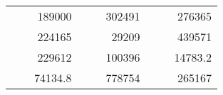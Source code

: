 \begin{table}[H]
\begin{tabular}{|ccrccrccr}
\rowcolor[HTML]{DAE8FC} 
\multicolumn{1}{|c|}{\cellcolor[HTML]{FFFFC7}}                                & \multicolumn{1}{c|}{\cellcolor[HTML]{DAE8FC}}                      & \multicolumn{1}{r|}{\cellcolor[HTML]{DAE8FC}189000}    & \multicolumn{1}{c|}{\cellcolor[HTML]{FFFFC7}}                                & \multicolumn{1}{c|}{\cellcolor[HTML]{DAE8FC}}                       & \multicolumn{1}{r|}{\cellcolor[HTML]{DAE8FC}302491}    & \multicolumn{1}{c|}{\cellcolor[HTML]{FFFFC7}}                                & \multicolumn{1}{c|}{\cellcolor[HTML]{DAE8FC}}                      & \multicolumn{1}{r|}{\cellcolor[HTML]{DAE8FC}276365}    \\ \cline{3-3} \cline{6-6} \cline{9-9} 
\multicolumn{1}{|c|}{\cellcolor[HTML]{FFFFC7}}                                & \multicolumn{1}{c|}{\cellcolor[HTML]{DAE8FC}}                      & \multicolumn{1}{r|}{\cellcolor[HTML]{DDFDFF}224165}    & \multicolumn{1}{c|}{\cellcolor[HTML]{FFFFC7}}                                & \multicolumn{1}{c|}{\cellcolor[HTML]{DAE8FC}}                       & \multicolumn{1}{r|}{\cellcolor[HTML]{DDFDFF}29209}     & \multicolumn{1}{c|}{\cellcolor[HTML]{FFFFC7}}                                & \multicolumn{1}{c|}{\cellcolor[HTML]{DAE8FC}}                      & \multicolumn{1}{r|}{\cellcolor[HTML]{DDFDFF}439571}    \\ \cline{3-3} \cline{6-6} \cline{9-9} 
\rowcolor[HTML]{DAE8FC} 
\multicolumn{1}{|c|}{\cellcolor[HTML]{FFFFC7}}                                & \multicolumn{1}{c|}{\cellcolor[HTML]{DAE8FC}}                      & \multicolumn{1}{r|}{\cellcolor[HTML]{DAE8FC}229612}    & \multicolumn{1}{c|}{\cellcolor[HTML]{FFFFC7}}                                & \multicolumn{1}{c|}{\cellcolor[HTML]{DAE8FC}}                       & \multicolumn{1}{r|}{\cellcolor[HTML]{DAE8FC}100396}    & \multicolumn{1}{c|}{\cellcolor[HTML]{FFFFC7}}                                & \multicolumn{1}{c|}{\cellcolor[HTML]{DAE8FC}}                      & \multicolumn{1}{r|}{\cellcolor[HTML]{DAE8FC}14783.2}   \\ \cline{3-3} \cline{6-6} \cline{9-9} 
\multicolumn{1}{|c|}{\cellcolor[HTML]{FFFFC7}}                                & \multicolumn{1}{c|}{\cellcolor[HTML]{DAE8FC}}                      & \multicolumn{1}{r|}{\cellcolor[HTML]{DDFDFF}74134.8}   & \multicolumn{1}{c|}{\cellcolor[HTML]{FFFFC7}}                                & \multicolumn{1}{c|}{\cellcolor[HTML]{DAE8FC}}                       & \multicolumn{1}{r|}{\cellcolor[HTML]{DDFDFF}778754}    & \multicolumn{1}{c|}{\cellcolor[HTML]{FFFFC7}}                                & \multicolumn{1}{c|}{\cellcolor[HTML]{DAE8FC}}                      & \multicolumn{1}{r|}{\cellcolor[HTML]{DDFDFF}265167}    \\ \cline{3-3} \cline{6-6} \cline{9-9} 

\end{tabular}
\end{table}
